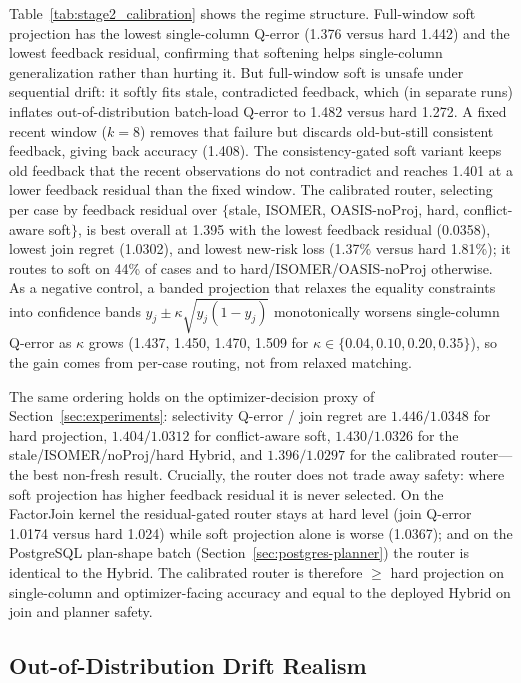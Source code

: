 \documentclass[preprint,12pt]{elsarticle}
\begin{document}


Table~\ref{tab:stage2_calibration} shows the regime structure. Full-window soft
projection has the lowest single-column Q-error (1.376 versus hard 1.442) and the
lowest feedback residual, confirming that softening helps single-column
generalization rather than hurting it. But full-window soft is unsafe under
sequential drift: it softly fits stale, contradicted feedback, which (in separate
runs) inflates out-of-distribution batch-load Q-error to 1.482 versus hard 1.272.
A fixed recent window ($k{=}8$) removes that failure but discards old-but-still
consistent feedback, giving back accuracy (1.408). The consistency-gated soft
variant keeps old feedback that the recent observations do not contradict and
reaches 1.401 at a lower feedback residual than the fixed window. The calibrated
router, selecting per case by feedback residual over
$\{$stale, ISOMER, OASIS-noProj, hard, conflict-aware soft$\}$, is best overall at
1.395 with the lowest feedback residual (0.0358), lowest join regret (1.0302), and
lowest new-risk loss (1.37\% versus hard 1.81\%); it routes to soft on 44\% of
cases and to hard/ISOMER/OASIS-noProj otherwise. As a negative control, a banded
projection that relaxes the equality constraints into confidence bands
$y_j\pm\kappa\sqrt{y_j(1-y_j)}$ monotonically worsens single-column Q-error as
$\kappa$ grows (1.437, 1.450, 1.470, 1.509 for $\kappa\in\{0.04,0.10,0.20,0.35\}$),
so the gain comes from per-case routing, not from relaxed matching.

The same ordering holds on the optimizer-decision proxy of
Section~\ref{sec:experiments}: selectivity Q-error / join regret are
$1.446/1.0348$ for hard projection, $1.404/1.0312$ for conflict-aware soft,
$1.430/1.0326$ for the stale/ISOMER/noProj/hard Hybrid, and $1.396/1.0297$ for
the calibrated router---the best non-fresh result. Crucially, the router does not
trade away safety: where soft projection has higher feedback residual it is never
selected. On the FactorJoin kernel the residual-gated router stays at hard level
(join Q-error 1.0174 versus hard 1.024) while soft projection alone is worse
(1.0367); and on the PostgreSQL plan-shape batch
(Section~\ref{sec:postgres-planner}) the router is identical to the Hybrid. The
calibrated router is therefore $\ge$ hard projection on single-column and
optimizer-facing accuracy and equal to the deployed Hybrid on join and planner
safety.

\subsection{Out-of-Distribution Drift Realism}
\label{sec:ood-drift-realism}
\end{document}
